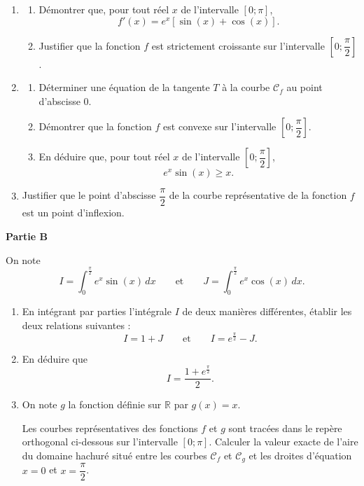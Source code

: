 \documentclass[11pt,a4paper]{article}
\begin{document}
\begin{enumerate}
  \item
  \begin{enumerate}
    \item Démontrer que, pour tout réel $x$ de l'intervalle $[0;\pi]$,
    \[
f'(x)=e^x[\sin(x)+\cos(x)].
    \]
    \item Justifier que la fonction $f$ est strictement croissante sur l'intervalle $\left[0;\dfrac{\pi}{2}\right]$.
  \end{enumerate}
  \item
  \begin{enumerate}
    \item Déterminer une équation de la tangente $T$ à la courbe $\mathcal C_f$ au point d'abscisse $0$.
    \item Démontrer que la fonction $f$ est convexe sur l'intervalle $\left[0;\dfrac{\pi}{2}\right]$.
    \item En déduire que, pour tout réel $x$ de l'intervalle $\left[0;\dfrac{\pi}{2}\right]$,
    \[
e^x\sin(x)\geqslant x.
    \]
  \end{enumerate}
  \item Justifier que le point d'abscisse $\dfrac{\pi}{2}$ de la courbe représentative de la fonction $f$ est un point d'inflexion.
\end{enumerate}

\textbf{Partie B}

On note
\[
I=\int_0^{\frac{\pi}{2}}e^x\sin(x)\,dx\qquad\text{et}\qquad J=\int_0^{\frac{\pi}{2}}e^x\cos(x)\,dx.
\]

\begin{enumerate}
  \item En intégrant par parties l'intégrale $I$ de deux manières différentes, établir les deux relations suivantes :
  \[
  I=1+J\qquad\text{et}\qquad I=e^{\frac{\pi}{2}}-J.
  \]
  \item En déduire que
  \[
  I=\dfrac{1+e^{\frac{\pi}{2}}}{2}.
  \]
  \item On note $g$ la fonction définie sur $\mathbb R$ par $g(x)=x$.

  Les courbes représentatives des fonctions $f$ et $g$ sont tracées dans le repère orthogonal ci-dessous sur l'intervalle $[0;\pi]$.
  Calculer la valeur exacte de l'aire du domaine hachuré situé entre les courbes $\mathcal C_f$ et $\mathcal C_g$ et les droites d'équation $x=0$ et $x=\dfrac{\pi}{2}$.
\end{enumerate}
\end{document}
